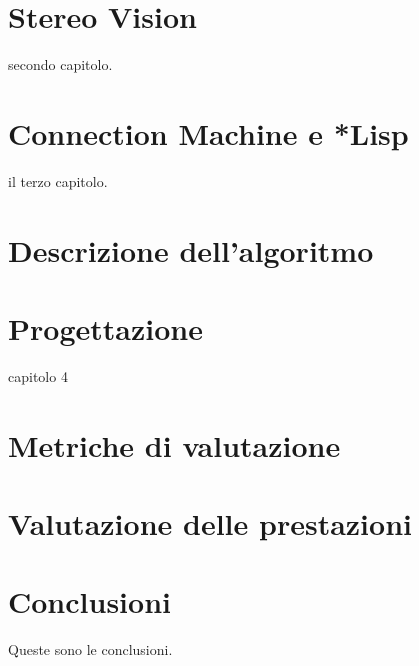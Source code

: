 \documentclass[12pt,a4paper,openright,twoside]{report}
\begin{document}
\chapter{Stereo Vision}

secondo capitolo.



\chapter{Connection Machine e *Lisp}

il terzo capitolo.



\chapter{Descrizione dell'algoritmo}



\chapter{Progettazione}

capitolo 4



\chapter{Metriche di valutazione}

\chapter{Valutazione delle prestazioni}

\chapter*{Conclusioni}


Queste sono le conclusioni.\\




\clearpage{\pagestyle{empty}\cleardoublepage}

\end{document}
